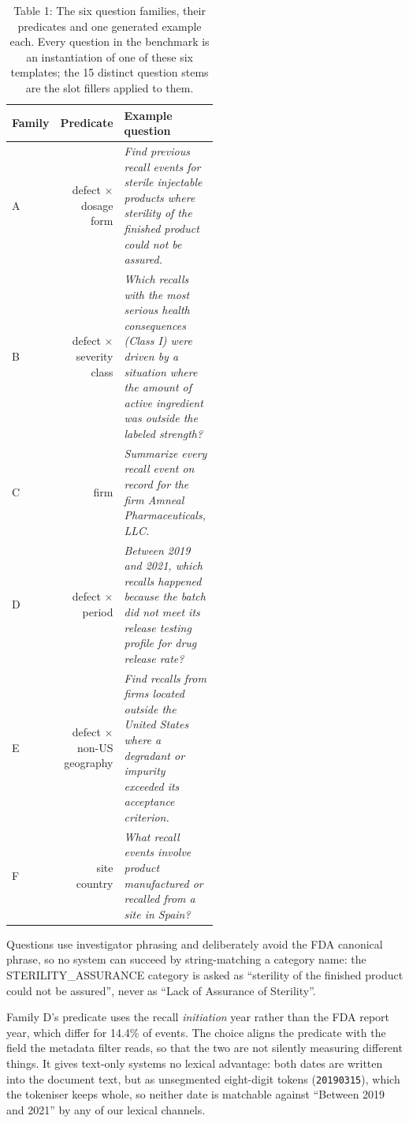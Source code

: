 \documentclass[acmsmall]{acmart}
\begin{document}
\begin{table}[t]
\centering
\small
\caption{Table 1: The six question families, their predicates and one generated example each. Every question in the benchmark is an instantiation of one of these six templates; the 15 distinct question stems are the slot fillers applied to them.}
\begin{tabular}{lrp{0.52\linewidth}}
\toprule
Family & Predicate & Example question \\
\midrule
A & defect $\times$ dosage form & \textit{Find previous recall events for sterile injectable products where sterility of the finished product could not be assured.} \\
B & defect $\times$ severity class & \textit{Which recalls with the most serious health consequences (Class I) were driven by a situation where the amount of active ingredient was outside the labeled strength?} \\
C & firm & \textit{Summarize every recall event on record for the firm Amneal Pharmaceuticals, LLC.} \\
D & defect $\times$ period & \textit{Between 2019 and 2021, which recalls happened because the batch did not meet its release testing profile for drug release rate?} \\
E & defect $\times$ non-US geography & \textit{Find recalls from firms located outside the United States where a degradant or impurity exceeded its acceptance criterion.} \\
F & site country & \textit{What recall events involve product manufactured or recalled from a site in Spain?} \\
\bottomrule
\end{tabular}
\end{table}

Questions use investigator phrasing and deliberately avoid the FDA canonical phrase, so no system can succeed by string-matching a category name: the STERILITY\_ASSURANCE category is asked as ``sterility of the finished product could not be assured'', never as ``Lack of Assurance of Sterility''.

Family D's predicate uses the recall \textit{initiation} year rather than the FDA report year, which differ for 14.4\% of events. The choice aligns the predicate with the field the metadata filter reads, so that the two are not silently measuring different things. It gives text-only systems no lexical advantage: both dates are written into the document text, but as unsegmented eight-digit tokens (\texttt{20190315}), which the tokeniser keeps whole, so neither date is matchable against ``Between 2019 and 2021'' by any of our lexical channels.
\end{document}
